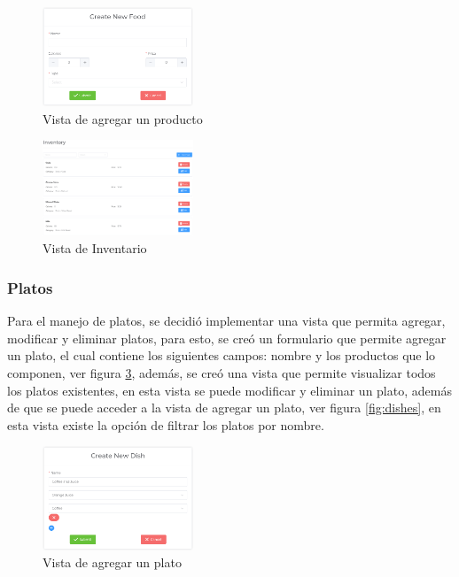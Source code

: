 \begin{figure}[H]
    \centering
    \includegraphics[width=0.4\textwidth]{assets/inventory_add.png}
    \caption{Vista de agregar un producto}
    \label{fig:inventory_add}
\end{figure}

\begin{figure}[H]
    \centering
    \includegraphics[width=0.4\textwidth]{assets/inventory.png}
    \caption{Vista de Inventario}
    \label{fig:inventory}
\end{figure}

\subsubsection{Platos}

Para el manejo de platos, se decidió implementar una vista que permita 
agregar, modificar y eliminar platos, para esto, se creó un formulario 
que permite agregar un plato, el cual contiene los siguientes campos: 
nombre y los productos que lo componen, ver figura \ref{fig:dishes_add},
además, se creó una vista que permite visualizar todos los platos 
existentes, en esta vista se puede modificar y eliminar un plato, además de 
que se puede acceder a la vista de agregar un plato, ver figura 
\ref{fig:dishes}, en esta vista existe la opción de filtrar los platos por 
nombre.

\begin{figure}[H]
    \centering
    \includegraphics[width=0.4\textwidth]{assets/dishes_add.png}
    \caption{Vista de agregar un plato}
    \label{fig:dishes_add}
\end{figure}

